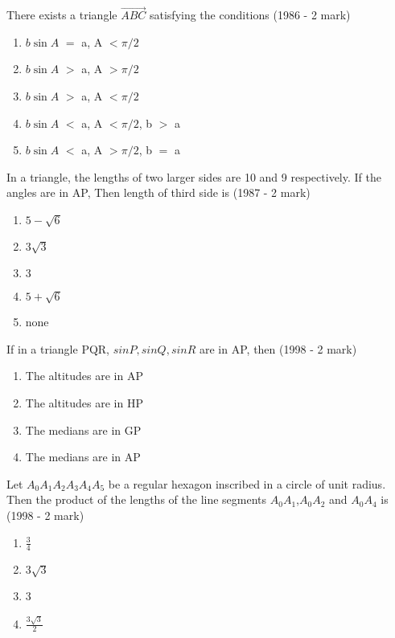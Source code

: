\iffalse
\title{Properties of Triangles}
\author{EE24Btech11022 - Eshan sharma}
\section{mcq-multiple}
\fi
    \item There exists a triangle $\vec{ABC}$ satisfying the conditions
    \hfill{(1986 - 2 mark)}
    \begin{enumerate}
    \item $b\sin{A}$ $=$ a, A $<\pi/2$
    \item $b\sin{A}$ $>$ a, A $>\pi/2$
    \item $b\sin{A}$ $>$ a, A $<\pi/2$
    \item $b\sin{A}$ $<$ a, A $<\pi/2$, b $>$ a
    \item $b\sin{A}$ $<$ a, A $>\pi/2$, b $=$ a
    \end{enumerate}
    \item In a triangle, the lengths of two larger sides are 10 and 9 respectively. If the angles are in AP, Then length of third side is
    \hfill{(1987 - 2 mark)}
    \begin{multicols}{2}
    \begin{enumerate}
    \item $5-\sqrt{6}$ 
    \item $3\sqrt{3}$
    \item $3$
    \item $5+\sqrt{6}$ 
    \item none
    \end{enumerate}
    \end{multicols}
    \item If in a triangle PQR, $sinP, sinQ, sinR$ are in AP, then
    \hfill{(1998 - 2 mark)}
    \begin{enumerate}
    \item The altitudes are in AP
    \item The altitudes are in HP
    \item The medians are in GP
    \item The medians are in AP
    \end{enumerate}
    \item Let $A_{0}A_{1}A_{2}A_{3}A_{4}A_{5}$ be a regular hexagon inscribed in a circle of unit radius. Then the product of the lengths of the line segments $A_{0}A_{1}$,$A_{0}A_{2}$ and $A_{0}A_{4}$ is 
    \hfill{(1998 - 2 mark)}
    \begin{multicols}{2}
    \begin{enumerate}
    \item ${\frac{3}{4}}$
    \item $3\sqrt{3}$
    \item 3
    \item ${\frac{3\sqrt{3}}{2}}$
    \end{enumerate}
    \end{multicols}
